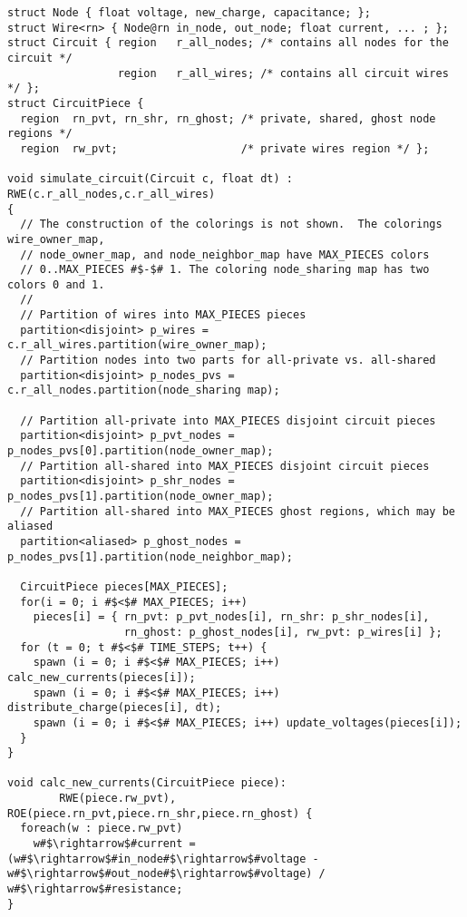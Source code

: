 \begin{lstlisting}[float={t},label={lst:code_ex},caption={Circuit simulation.}]
struct Node { float voltage, new_charge, capacitance; };
struct Wire<rn> { Node@rn in_node, out_node; float current, ... ; };
struct Circuit { region   r_all_nodes; /* contains all nodes for the circuit */
                 region   r_all_wires; /* contains all circuit wires */ };
struct CircuitPiece {
  region  rn_pvt, rn_shr, rn_ghost; /* private, shared, ghost node regions */
  region  rw_pvt;                   /* private wires region */ };

void simulate_circuit(Circuit c, float dt) : RWE(c.r_all_nodes,c.r_all_wires)
{
  // The construction of the colorings is not shown.  The colorings wire_owner_map,
  // node_owner_map, and node_neighbor_map have MAX_PIECES colors 
  // 0..MAX_PIECES #$-$# 1. The coloring node_sharing map has two colors 0 and 1.
  //
  // Partition of wires into MAX_PIECES pieces
  partition<disjoint> p_wires = c.r_all_wires.partition(wire_owner_map); 
  // Partition nodes into two parts for all-private vs. all-shared
  partition<disjoint> p_nodes_pvs = c.r_all_nodes.partition(node_sharing map);

  // Partition all-private into MAX_PIECES disjoint circuit pieces
  partition<disjoint> p_pvt_nodes = p_nodes_pvs[0].partition(node_owner_map);
  // Partition all-shared into MAX_PIECES disjoint circuit pieces
  partition<disjoint> p_shr_nodes = p_nodes_pvs[1].partition(node_owner_map);
  // Partition all-shared into MAX_PIECES ghost regions, which may be aliased
  partition<aliased> p_ghost_nodes = p_nodes_pvs[1].partition(node_neighbor_map);

  CircuitPiece pieces[MAX_PIECES];
  for(i = 0; i #$<$# MAX_PIECES; i++) 
    pieces[i] = { rn_pvt: p_pvt_nodes[i], rn_shr: p_shr_nodes[i],
                  rn_ghost: p_ghost_nodes[i], rw_pvt: p_wires[i] };
  for (t = 0; t #$<$# TIME_STEPS; t++) {
    spawn (i = 0; i #$<$# MAX_PIECES; i++) calc_new_currents(pieces[i]);
    spawn (i = 0; i #$<$# MAX_PIECES; i++) distribute_charge(pieces[i], dt);
    spawn (i = 0; i #$<$# MAX_PIECES; i++) update_voltages(pieces[i]);
  }
}

void calc_new_currents(CircuitPiece piece):
        RWE(piece.rw_pvt), ROE(piece.rn_pvt,piece.rn_shr,piece.rn_ghost) {
  foreach(w : piece.rw_pvt)
    w#$\rightarrow$#current = (w#$\rightarrow$#in_node#$\rightarrow$#voltage - w#$\rightarrow$#out_node#$\rightarrow$#voltage) / w#$\rightarrow$#resistance;
}


\end{lstlisting}
